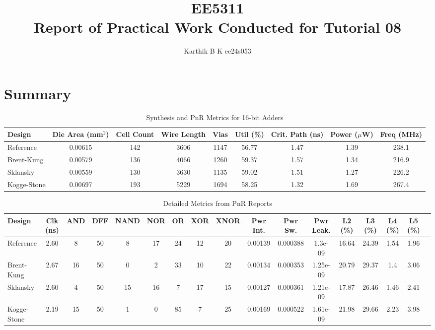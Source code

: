 \documentclass[10pt,a4paper]{article}
\begin{document}
\title{EE5311 \\ Report of Practical Work Conducted for Tutorial 08}
\author{Karthik B K ee24s053}
\maketitle

\section{Summary}

\begin{table}[ht]
\centering
\caption{Synthesis and PnR Metrics for 16-bit Adders}
\begin{tabular}{lcccccccc}
\hline
Design & Die Area (mm$^2$) & Cell Count & Wire Length & Vias & Util (\%) & Crit. Path (ns) & Power ($\mu$W) & Freq (MHz) \\
\hline
Reference   & 0.00615 & 142 & 3606 & 1147 & 56.77 & 1.47 & 1.39 & 238.1 \\
Brent-Kung  & 0.00579 & 136 & 4066 & 1260 & 59.37 & 1.57 & 1.34 & 216.9 \\
Sklansky    & 0.00559 & 130 & 3630 & 1135 & 59.02 & 1.51 & 1.27 & 226.2 \\
Kogge-Stone & 0.00697 & 193 & 5229 & 1694 & 58.25 & 1.32 & 1.69 & 267.4 \\
\hline
\end{tabular}
\label{tab:adders-pnr}
\end{table}

\begin{table}[ht]
\centering
\caption{Detailed Metrics from PnR Reports}
\begin{tabular}{lcccccccccccccccc}
\hline
Design & Clk (ns) & AND & DFF & NAND & NOR & OR & XOR & XNOR & Pwr Int. & Pwr Sw. & Pwr Leak. & L2 (\%) & L3 (\%) & L4 (\%) & L5 (\%) \\
\hline
Reference   & 2.60 & 8  & 50 & 8  & 17 & 24 & 12 & 20 & 0.00139 & 0.000388 & 1.3e-09 & 16.64 & 24.39 & 1.54 & 1.96 \\
Brent-Kung  & 2.67 & 16 & 50 & 0  & 2  & 33 & 10 & 22 & 0.00134 & 0.000353 & 1.25e-09 & 20.79 & 29.37 & 1.4  & 3.06 \\
Sklansky    & 2.60 & 4  & 50 & 15 & 16 & 7  & 17 & 15 & 0.00127 & 0.000361 & 1.21e-09 & 17.87 & 26.46 & 1.46 & 2.41 \\
Kogge-Stone & 2.19 & 15 & 50 & 1  & 0  & 85 & 7  & 25 & 0.00169 & 0.000522 & 1.61e-09 & 21.98 & 29.66 & 2.23 & 3.98 \\
\hline
\end{tabular}
\label{tab:adders-detailed}
\end{table}
\end{document}
